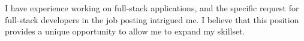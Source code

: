 \documentclass[11pt, a4paper]{awesome-cv}
\begin{document}
\begin{cvletter}
I have experience working on full-stack applications, 
and the specific request for full-stack developers in the job posting intrigued me.
I believe that this position provides a unique opportunity to allow me to expand my skillset.


\end{cvletter}
\end{document}
